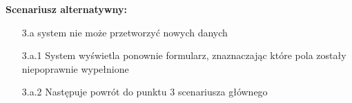 \hspace{0cm}\textbf{Scenariusz alternatywny: }
\begin{enumerate}
\item[3.a] system nie może przetworzyć nowych danych
\item[3.a.1] System wyświetla ponownie formularz, znaznaczając które pola zostały niepoprawnie wypełnione
\item[3.a.2] Następuje powrót do punktu 3 scenariusza głównego
\end{enumerate}